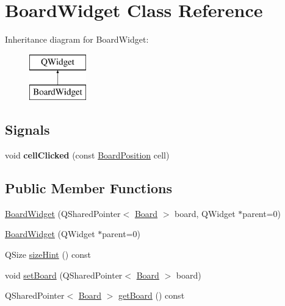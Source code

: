 \hypertarget{class_board_widget}{}\section{Board\+Widget Class Reference}
\label{class_board_widget}
Inheritance diagram for Board\+Widget\+:\begin{figure}[H]
\begin{center}
\leavevmode
\includegraphics[height=2.000000cm]{class_board_widget}
\end{center}
\end{figure}
\subsection*{Signals}
\begin{DoxyCompactItemize}
\item 
\hypertarget{class_board_widget_adba731e80188fa0e43e925978997d2ce}{}void {\bfseries cell\+Clicked} (const \hyperlink{struct_board_position}{Board\+Position} cell)\label{class_board_widget_adba731e80188fa0e43e925978997d2ce}

\end{DoxyCompactItemize}
\subsection*{Public Member Functions}
\begin{DoxyCompactItemize}
\item 
\hyperlink{class_board_widget_a260ca35e417d25cc3e27401825793140}{Board\+Widget} (Q\+Shared\+Pointer$<$ \hyperlink{class_board}{Board} $>$ board, Q\+Widget $\ast$parent=0)
\item 
\hyperlink{class_board_widget_a532acccc2b203b2418e2b0bc358d7886}{Board\+Widget} (Q\+Widget $\ast$parent=0)
\item 
Q\+Size \hyperlink{class_board_widget_a86fa804cef03ad6ba2ee9f7b7b5323eb}{size\+Hint} () const 
\item 
void \hyperlink{class_board_widget_a0e0b3f9a57f30fd7aa13fab160cc91c1}{set\+Board} (Q\+Shared\+Pointer$<$ \hyperlink{class_board}{Board} $>$ board)
\item 
Q\+Shared\+Pointer$<$ \hyperlink{class_board}{Board} $>$ \hyperlink{class_board_widget_a34253aacadef1560220ead326bfc469d}{get\+Board} () const 
\end{DoxyCompactItemize}
